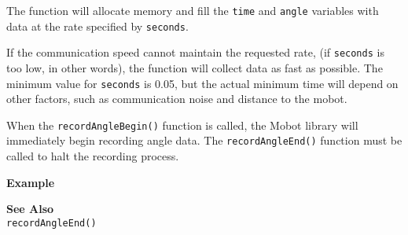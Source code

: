 The function will allocate memory and fill the \texttt{time} and \texttt{angle} variables with data
at the rate specified by \texttt{seconds}. 

If the communication speed cannot maintain 
the requested rate, (if \texttt{seconds} is too low, in other words), the function will
collect data as fast as possible. The minimum value for \texttt{seconds} is 0.05, but
the actual minimum time will depend on other factors, such as communication noise and
distance to the mobot.

When the \texttt{recordAngleBegin()} function is called, the Mobot library will 
immediately begin recording angle data. The \texttt{recordAngleEnd()} function
must be called to halt the recording process. 

\noindent
{\bf Example}\\
\noindent

\noindent
{\bf See Also}\\
\texttt{recordAngleEnd()} \\
